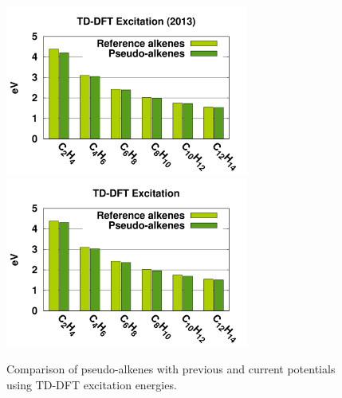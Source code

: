 \documentclass[12pt]{article}
\begin{document}
\begin{figure}
\begin{center}
\includegraphics[width=8cm]{short_pbe0_tddft_2013}
\includegraphics[width=8cm]{short_pbe0_tddft}
\end{center}
\vspace{0.25in}
\hspace*{3in}

\caption{Comparison of pseudo-alkenes with previous\cite{drujon_pseudopotentials_2013} and current potentials using TD-DFT excitation energies.}
\label{fig:alkenes_tddft}
\end{figure}
\end{document}
